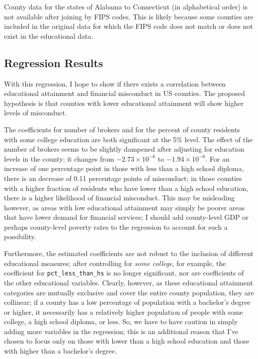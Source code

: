 \documentclass[
]{article}
\begin{document}
County data for the states of Alabama to Connecticut (in alphabetical
order) is not available after joining by FIPS codes. This is likely
because some counties are included in the original data for which the
FIPS code does not match or does not exist in the educational data.

\hypertarget{regression-results}{%
\subsection{Regression Results}\label{regression-results}}

With this regression, I hope to show if there exists a correlation
between educational attainment and financial misconduct in US counties.
The proposed hypothesis is that counties with lower educational
attainment will show higher levels of misconduct.

The coefficients for number of brokers and for the percent of county
residents with some college education are both significant at the 5\%
level. The effect of the number of brokers seems to be slightly dampened
after adjusting for education levels in the county; it changes from
\(-2.73 \times 10^{-6}\) to \(-1.94 \times 10^{-6}\). For an increase of
one percentage point in those with less than a high school diploma,
there is an decrease of 0.11 percentage points of misconduct; in those
counties with a higher fraction of residents who have lower than a high
school education, there is a higher likelihood of financial misconduct.
This may be misleading however, as areas with low educational attainment
may simply be poorer areas that have lower demand for financial
services; I should add county-level GDP or perhaps county-level poverty
rates to the regression to account for such a possibility.

Furthermore, the estimated coefficients are not robust to the inclusion
of different educational measures; after controlling for \emph{some
college}, for example, the coefficient for \texttt{pct\_less\_than\_hs}
is no longer significant, nor are coefficients of the other educational
variables. Clearly, however, as these educational attainment categories
are mutually exclusive and cover the entire county population, they are
collinear; if a county has a low percentage of population with a
bachelor's degree or higher, it necessarily has a relatively higher
population of people with some college, a high school diploma, or less.
So, we have to have caution in simply adding more variables in the
regression; this is an additional reason that I've chosen to focus only
on those with lower than a high school education and those with higher
than a bachelor's degree.
\end{document}
